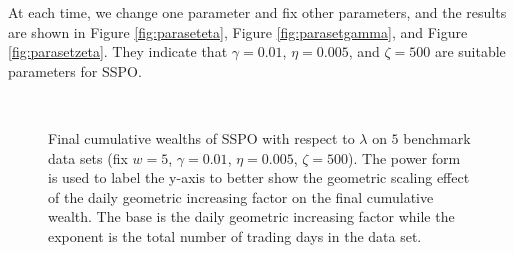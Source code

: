 \documentclass[twoside,11pt]{article}
\begin{document}
At each time, we change one parameter and fix other parameters, and the results are shown in Figure \ref{fig:paraseteta}, Figure \ref{fig:parasetgamma}, and Figure \ref{fig:parasetzeta}. They indicate that $\gamma=0.01$, $\eta=0.005$, and $\zeta=500$ are suitable parameters for SSPO.


\begin{figure}[!htb]
	\centering
		\\
	\caption{Final cumulative wealths of SSPO with respect to $\lambda$ on $5$ benchmark data sets (fix $w=5$, $\gamma=0.01$, $\eta=0.005$, $\zeta=500$). The power form is used to label the y-axis to better show the geometric scaling effect of the daily geometric increasing factor on the final cumulative wealth. The base is the daily geometric increasing factor while the exponent is the total number of trading days in the data set.}
	\label{fig:parasetlbd}
\end{figure}
\end{document}
